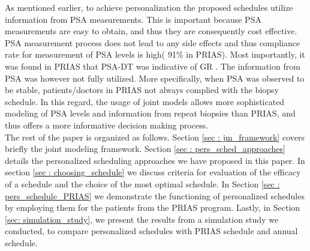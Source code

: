 As mentioned earlier, to achieve personalization the proposed schedules utilize information from PSA measurements. This is important because PSA measurements are easy to obtain, and thus they are consequently cost effective. PSA measurement process does not lead to any side effects and thus compliance rate for measurement of PSA levels is high( 91\% in PRIAS). Most importantly, it was found in PRIAS that PSA-DT was indicative of GR \cite{bokhorst2015compliance}. The information from PSA was however not fully utilized. More specifically, when PSA was observed to be stable, patients/doctors in PRIAS not always complied with the biopsy schedule. In this regard, the usage of joint models allows more sophisticated modeling of PSA levels and information from repeat biopsies than PRIAS, and thus offers a more informative decision making process.\\

The rest of the paper is organized as follows. Section \ref{sec : jm_framework} covers briefly the joint modeling framework. Section \ref{sec : pers_sched_approaches} details the personalized scheduling approaches we have proposed in this paper. In section \ref{sec : choosing_schedule} we discuss criteria for evaluation of the efficacy of a schedule and the choice of the most optimal schedule. In Section \ref{sec : pers_schedule_PRIAS} we demonstrate the functioning of personalized schedules by employing them for the patients from the PRIAS program. Lastly, in Section \ref{sec: simulation_study}, we present the results from a simulation study we conducted, to compare personalized schedules with PRIAS schedule and annual schedule.